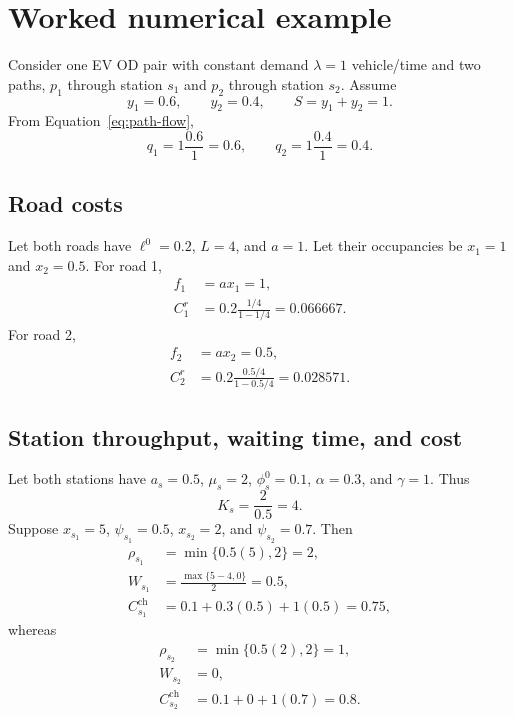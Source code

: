 \documentclass[11pt]{article}
\begin{document}
\section{Worked numerical example}

Consider one EV OD pair with constant demand $\lambda=1$ vehicle/time and two
paths, $p_1$ through station $s_1$ and $p_2$ through station $s_2$. Assume
\begin{equation}
    y_1=0.6,\qquad y_2=0.4,\qquad S=y_1+y_2=1.
\end{equation}
From Equation~\eqref{eq:path-flow},
\begin{equation}
    q_1=1\frac{0.6}{1}=0.6,
    \qquad
    q_2=1\frac{0.4}{1}=0.4.
\end{equation}

\subsection*{Road costs}

Let both roads have $\ell^0=0.2$, $L=4$, and $a=1$. Let their occupancies be
$x_1=1$ and $x_2=0.5$. For road 1,
\begin{align}
    f_1&=a x_1=1,\\
    C_1^r&=0.2\frac{1/4}{1-1/4}
          =0.066667.
\end{align}
For road 2,
\begin{align}
    f_2&=a x_2=0.5,\\
    C_2^r&=0.2\frac{0.5/4}{1-0.5/4}
          =0.028571.
\end{align}

\subsection*{Station throughput, waiting time, and cost}

Let both stations have $a_s=0.5$, $\mu_s=2$, $\phi_s^0=0.1$,
$\alpha=0.3$, and $\gamma=1$. Thus
\begin{equation}
    K_s=\frac{2}{0.5}=4.
\end{equation}
Suppose $x_{s_1}=5$, $\psi_{s_1}=0.5$, $x_{s_2}=2$, and
$\psi_{s_2}=0.7$. Then
\begin{align}
    \rho_{s_1}&=\min\{0.5(5),2\}=2,\\
    W_{s_1}&=\frac{\max\{5-4,0\}}{2}=0.5,\\
    C_{s_1}^{\mathrm{ch}}&=0.1+0.3(0.5)+1(0.5)=0.75,
\end{align}
whereas
\begin{align}
    \rho_{s_2}&=\min\{0.5(2),2\}=1,\\
    W_{s_2}&=0,\\
    C_{s_2}^{\mathrm{ch}}&=0.1+0+1(0.7)=0.8.
\end{align}
\end{document}
